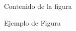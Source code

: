 \begin{figure}[t]
	\centering
	\begin{framed}
        Contenido de la figura
    \end{framed}
    \caption{Ejemplo de Figura}
	\label{fig:example}
\end{figure}
